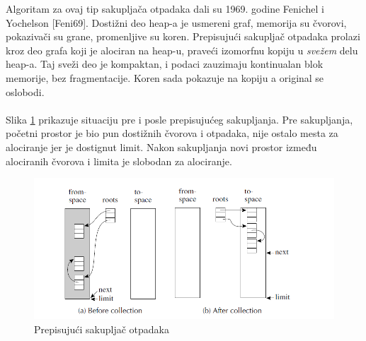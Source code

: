 Algoritam za ovaj tip sakupljača otpadaka dali su 1969. godine Fenichel i
Yochelson [Feni69].
Dostižni deo heap-a je usmereni graf, memorija su čvorovi, pokazivači su grane, promenljive su koren.
Prepisujući sakupljač otpadaka prolazi kroz deo grafa koji je alociran na heap-u, praveći izomorfnu kopiju u \textit{svežem} delu heap-a.
Taj sveži deo je kompaktan, i podaci zauzimaju kontinualan blok memorije, bez fragmentacije.
Koren sada pokazuje na kopiju a original se oslobodi.
\\
\\
Slika \ref{fig:copygc} prikazuje situaciju pre i posle prepisujućeg sakupljanja.
Pre sakupljanja, početni prostor je bio pun dostižnih čvorova i otpadaka, nije ostalo mesta za alociranje jer je dostignut limit.
Nakon sakupljanja novi prostor između alociranih čvorova i limita je slobodan za alociranje.

\begin{figure}[h!]
\begin{center}
\includegraphics[scale=0.55]{copygc.png}
\end{center}
\caption{Prepisujući sakupljač otpadaka}
\label{fig:copygc}
\end{figure}


